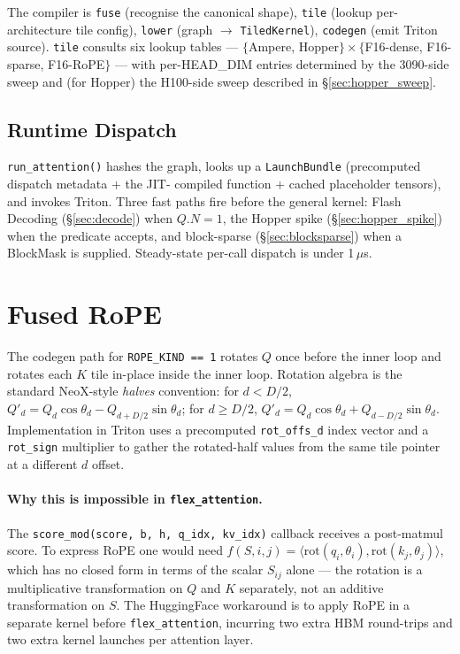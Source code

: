 \documentclass[10pt,twocolumn]{article}
\begin{document}
The compiler is \texttt{fuse} (recognise the canonical shape),
\texttt{tile} (lookup per-architecture tile config),
\texttt{lower} (graph $\to$ \texttt{TiledKernel}), \texttt{codegen}
(emit Triton source). \texttt{tile} consults six lookup tables ---
$\{$Ampere, Hopper$\} \times \{$F16-dense, F16-sparse,
F16-RoPE$\}$ --- with per-HEAD\_DIM entries determined by the
3090-side sweep and (for Hopper) the H100-side sweep described in
\S\ref{sec:hopper_sweep}.

\subsection{Runtime Dispatch}

\texttt{run\_attention()} hashes the graph, looks up a
\texttt{LaunchBundle} (precomputed dispatch metadata + the JIT-
compiled function + cached placeholder tensors), and invokes
Triton. Three fast paths fire before the general kernel: Flash
Decoding (\S\ref{sec:decode}) when $Q.N=1$, the Hopper spike
(\S\ref{sec:hopper_spike}) when the predicate accepts, and
block-sparse (\S\ref{sec:blocksparse}) when a BlockMask is supplied.
Steady-state per-call dispatch is under 1\,$\mu$s.

\section{Fused RoPE}
\label{sec:rope}

The codegen path for \texttt{ROPE\_KIND == 1} rotates $Q$ once
before the inner loop and rotates each $K$ tile in-place inside the
inner loop. Rotation algebra is the standard NeoX-style
\textit{halves} convention: for $d < D/2$,
$Q'_d = Q_d \cos\theta_d - Q_{d+D/2} \sin\theta_d$; for $d \geq D/2$,
$Q'_d = Q_d \cos\theta_d + Q_{d-D/2} \sin\theta_d$. Implementation
in Triton uses a precomputed \texttt{rot\_offs\_d} index vector and
a \texttt{rot\_sign} multiplier to gather the rotated-half values
from the same tile pointer at a different $d$ offset.

\paragraph{Why this is impossible in \texttt{flex\_attention}.} The
\texttt{score\_mod(score, b, h, q\_idx, kv\_idx)} callback receives
a post-matmul score. To express RoPE one would need
$f(S, i, j) = \langle \text{rot}(q_i, \theta_i),
\text{rot}(k_j, \theta_j) \rangle$, which has no closed form in
terms of the scalar $S_{ij}$ alone --- the rotation is a
multiplicative transformation on $Q$ and $K$ separately, not an
additive transformation on $S$. The HuggingFace workaround is to
apply RoPE in a separate kernel before \texttt{flex\_attention},
incurring two extra HBM round-trips and two extra kernel launches
per attention layer.
\end{document}
